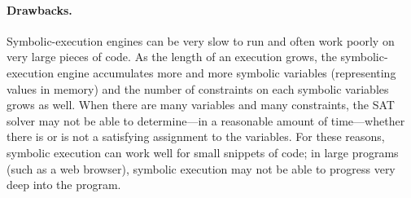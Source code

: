 \paragraph{Drawbacks.}
Symbolic-execution engines can be very slow to run and often work
poorly on very large pieces of code. 
As the length of an execution grows, the symbolic-execution engine
accumulates more and more symbolic variables (representing values in memory)
and the number of constraints on each symbolic variables grows as well.
When there are many variables and many constraints, the SAT solver may
not be able to determine---in a reasonable amount of time---whether 
there is or is not a satisfying assignment to the variables.
For these reasons, symbolic execution can work well for small snippets of code;
in large programs (such as a web browser), symbolic execution may 
not be able to progress very deep into the program.


